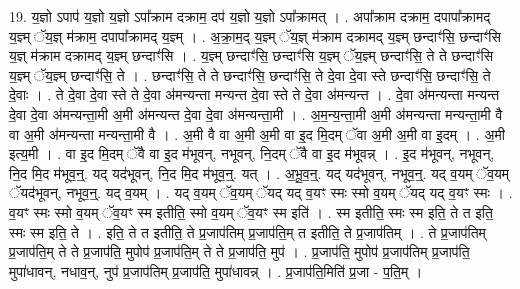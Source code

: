 \documentclass[17pt]{extarticle}
\begin{document}
19. य॒ज्ञो ऽपाप॑ य॒ज्ञो य॒ज्ञो ऽपा᳚क्राम दक्राम॒ दप॑ य॒ज्ञो य॒ज्ञो ऽपा᳚क्रामत् । . अपा᳚क्राम दक्राम॒ दपापा᳚क्रामद् य॒ज्ञ्म् ॅय॒ज्ञ् म॑क्राम॒ दपापा᳚क्रामद् य॒ज्ञ्म् । . अ॒क्रा॒म॒द् य॒ज्ञ्म् ॅय॒ज्ञ् म॑क्राम दक्रामद् य॒ज्ञ्म् छन्दाꣳ॑सि॒ छन्दाꣳ॑सि य॒ज्ञ् म॑क्राम दक्रामद् य॒ज्ञ्म् छन्दाꣳ॑सि । . य॒ज्ञ्म् छन्दाꣳ॑सि॒ छन्दाꣳ॑सि य॒ज्ञ्म् ॅय॒ज्ञ्म् छन्दाꣳ॑सि॒ ते ते छन्दाꣳ॑सि य॒ज्ञ्म् ॅय॒ज्ञ्म् छन्दाꣳ॑सि॒ ते । . छन्दाꣳ॑सि॒ ते ते छन्दाꣳ॑सि॒ छन्दाꣳ॑सि॒ ते दे॒वा दे॒वा स्ते छन्दाꣳ॑सि॒ छन्दाꣳ॑सि॒ ते दे॒वाः । . ते दे॒वा दे॒वा स्ते ते दे॒वा अ॑मन्यन्ता मन्यन्त दे॒वा स्ते ते दे॒वा अ॑मन्यन्त । . दे॒वा अ॑मन्यन्ता मन्यन्त दे॒वा दे॒वा अ॑मन्यन्ता॒मी अ॒मी अ॑मन्यन्त दे॒वा दे॒वा अ॑मन्यन्ता॒मी । . अ॒म॒न्य॒न्ता॒मी अ॒मी अ॑मन्यन्ता मन्यन्ता॒मी वै वा अ॒मी अ॑मन्यन्ता मन्यन्ता॒मी वै । . अ॒मी वै वा अ॒मी अ॒मी वा इ॒द मि॒दम् ॅवा अ॒मी अ॒मी वा इ॒दम् । . अ॒मी इत्य॒मी । . वा इ॒द मि॒दम् ॅवै वा इ॒द म॑भूवन्, नभूवन्, नि॒दम् ॅवै वा इ॒द म॑भूवन्न् । . इ॒द म॑भूवन्, नभूवन्, नि॒द मि॒द म॑भूव॒न्॒. यद् यद॑भूवन्, नि॒द मि॒द म॑भूव॒न्॒. यत् । . अ॒भू॒व॒न्॒. यद् यद॑भूवन्, नभूव॒न्॒. यद् व॒यम् ॅव॒यम् ॅयद॑भूवन्, नभूव॒न्॒. यद् व॒यम् । . यद् व॒यम् ॅव॒यम् ॅयद् यद् व॒यꣳ स्मः स्मो व॒यम् ॅयद् यद् व॒यꣳ स्मः । . व॒यꣳ स्मः स्मो व॒यम् ॅव॒यꣳ स्म इतीति॒ स्मो व॒यम् ॅव॒यꣳ स्म इति॑ । . स्म इतीति॒ स्मः स्म इति॒ ते त इति॒ स्मः स्म इति॒ ते । . इति॒ ते त इतीति॒ ते प्र॒जाप॑तिम् प्र॒जाप॑ति॒म् त इतीति॒ ते प्र॒जाप॑तिम् । . ते प्र॒जाप॑तिम् प्र॒जाप॑ति॒म् ते ते प्र॒जाप॑ति॒ मुपोप॑ प्र॒जाप॑ति॒म् ते ते प्र॒जाप॑ति॒ मुप॑ । . प्र॒जाप॑ति॒ मुपोप॑ प्र॒जाप॑तिम् प्र॒जाप॑ति॒ मुपा॑धावन्, नधाव॒न्, नुप॑ प्र॒जाप॑तिम् प्र॒जाप॑ति॒ मुपा॑धावन्न् । . प्र॒जाप॑ति॒मिति॑ प्र॒जा - प॒ति॒म् । \newline
\end{document}
